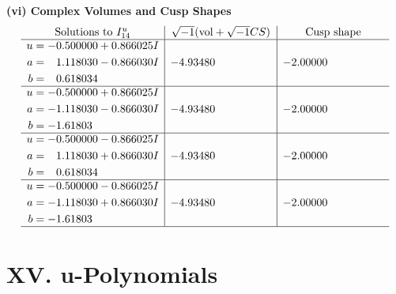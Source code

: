 \documentclass[1p]{elsarticle_modified}
\theoremstyle{definition}
\newcommand{\I}{\sqrt{-1}}
\begin{document}
\newpage\flushleft \textbf{(vi) Complex Volumes and Cusp Shapes}
$$\begin{array}{c|c|c}  
\text{Solutions to }I^u_{14}& \I (\text{vol} + \sqrt{-1}CS) & \text{Cusp shape}\\
 \hline 
\begin{aligned}
u &= -0.500000 + 0.866025 I \\
a &= \phantom{-}1.118030 - 0.866030 I \\
b &= \phantom{-}0.618034\phantom{ +0.000000I}\end{aligned}
 & -4.93480\phantom{ +0.000000I} & -2.00000\phantom{ +0.000000I} \\ \hline\begin{aligned}
u &= -0.500000 + 0.866025 I \\
a &= -1.118030 - 0.866030 I \\
b &= -1.61803\phantom{ +0.000000I}\end{aligned}
 & -4.93480\phantom{ +0.000000I} & -2.00000\phantom{ +0.000000I} \\ \hline\begin{aligned}
u &= -0.500000 - 0.866025 I \\
a &= \phantom{-}1.118030 + 0.866030 I \\
b &= \phantom{-}0.618034\phantom{ +0.000000I}\end{aligned}
 & -4.93480\phantom{ +0.000000I} & -2.00000\phantom{ +0.000000I} \\ \hline\begin{aligned}
u &= -0.500000 - 0.866025 I \\
a &= -1.118030 + 0.866030 I \\
b &= -1.61803\phantom{ +0.000000I}\end{aligned}
 & -4.93480\phantom{ +0.000000I} & -2.00000\phantom{ +0.000000I}\\
 \hline 
 \end{array}$$\newpage
\newpage\renewcommand{\arraystretch}{1}
\centering \section*{ XV. u-Polynomials}
\end{document}
